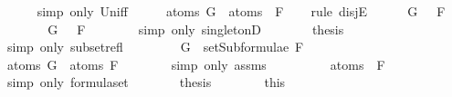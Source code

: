 \begin{isabellebody}
\ \ \ \ \isamarkupfalse%
\ {\isacharparenleft}simp\ only{\isacharcolon}\ Un{\isacharunderscore}iff{\isacharparenright}\isanewline
\ \ \isamarkupfalse%
\ \isamarkupfalse%
\ {\isachardoublequoteopen}atoms\ G\ {\isasymsubseteq}\ atoms\ {\isacharparenleft}\isactrlbold {\isasymnot}\ F{\isacharparenright}{\isachardoublequoteclose}\isanewline
\ \ \isamarkupfalse%
\ {\isacharparenleft}rule\ disjE{\isacharparenright}\isanewline
\ \ \ \ \isamarkupfalse%
\ {\isachardoublequoteopen}G\ {\isasymin}\ {\isacharbraceleft}\isactrlbold {\isasymnot}\ F{\isacharbraceright}{\isachardoublequoteclose}\isanewline
\ \ \ \ \isamarkupfalse%
\ \isamarkupfalse%
\ {\isachardoublequoteopen}G\ {\isacharequal}\ \isactrlbold {\isasymnot}\ F{\isachardoublequoteclose}\isanewline
\ \ \ \ \ \ \isamarkupfalse%
\ {\isacharparenleft}simp\ only{\isacharcolon}\ singletonD{\isacharparenright}\isanewline
\ \ \ \ \isamarkupfalse%
\ \isamarkupfalse%
\ {\isacharquery}thesis\isanewline
\ \ \ \ \ \ \isamarkupfalse%
\ {\isacharparenleft}simp\ only{\isacharcolon}\ subset{\isacharunderscore}refl{\isacharparenright}\isanewline
\ \ \isamarkupfalse%
\isanewline
\ \ \ \ \isamarkupfalse%
\ {\isachardoublequoteopen}G\ {\isasymin}\ setSubformulae\ F{\isachardoublequoteclose}\isanewline
\ \ \ \ \isamarkupfalse%
\ \isamarkupfalse%
\ {\isachardoublequoteopen}atoms\ G\ {\isasymsubseteq}\ atoms\ F{\isachardoublequoteclose}\isanewline
\ \ \ \ \ \ \isamarkupfalse%
\ {\isacharparenleft}simp\ only{\isacharcolon}\ assms{\isacharparenleft}{}{\isacharparenright}{\isacharparenright}\isanewline
\ \ \ \ \isamarkupfalse%
\ \isamarkupfalse%
\ {\isachardoublequoteopen}{\isasymdots}\ {\isacharequal}\ atoms\ {\isacharparenleft}\isactrlbold {\isasymnot}\ F{\isacharparenright}{\isachardoublequoteclose}\isanewline
\ \ \ \ \ \ \isamarkupfalse%
\ {\isacharparenleft}simp\ only{\isacharcolon}\ formula{\isachardot}set{\isacharparenleft}{}{\isacharparenright}{\isacharparenright}\isanewline
\ \ \ \ \isamarkupfalse%
\ \isamarkupfalse%
\ {\isacharquery}thesis\isanewline
\ \ \ \ \ \ \isamarkupfalse%
\ this\isanewline
\ \ \isamarkupfalse%
\isanewline
{}\isamarkupfalse%
%
\endisatagproof
{\isafoldproof}%
%
\isadelimproof
\isanewline

\end{isabellebody}
